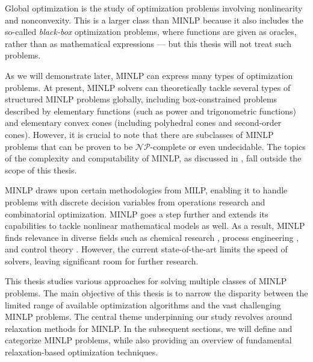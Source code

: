 Global optimization is the study of optimization problems involving nonlinearity and nonconvexity. This is a larger class than MINLP because it also includes the so-called \emph{black-box} optimization problems, where functions are given as oracles, rather than as mathematical expressions --- but this thesis will not treat such problems.


As we will demonstrate later, MINLP can express many types of optimization problems.
At present, MINLP solvers \cite{couenne,bestuzheva2023global,sahinidis:baron:21.1.13} can theoretically tackle several types of structured MINLP problems globally, including box-constrained problems  described by elementary functions (such as power and trigonometric functions) and elementary convex cones (including polyhedral cones and second-order cones).  However, it is crucial to note that there are subclasses of MINLP problems that can be proven to be $\mathcal{NP}$-complete or even undecidable. The topics of  the complexity and computability of MINLP, as discussed in \cite{liberti2019undecidability}, fall outside the scope of this thesis.

MINLP draws upon certain methodologies from MILP, enabling it to handle  problems with discrete decision variables from operations research and combinatorial optimization.  MINLP goes a step further and extends its capabilities to tackle nonlinear mathematical models as well. As a result, MINLP finds relevance in diverse fields such as chemical research \cite{pistikopoulos2021process}, process engineering \cite{kocis1989computational}, and control theory \cite{harjunkoski2009integration}.  However, the current state-of-the-art limits the  speed of solvers, leaving significant room for further research.


This thesis studies various approaches for solving multiple classes of MINLP problems. The main objective of this thesis is to narrow the disparity between the limited range of available optimization algorithms and the vast challenging MINLP problems. The central theme underpinning our study revolves around relaxation methods for MINLP. In the subsequent sections, we will define and categorize MINLP problems, while also providing an overview of fundamental relaxation-based optimization techniques.

